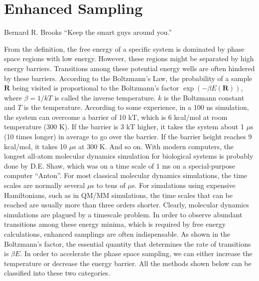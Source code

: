 \chapter{Enhanced Sampling\label{chapter:ES}}
\begin{chapquote}{Bernard R. Brooks%
	}
	``Keep the smart guys around you.''
\end{chapquote}
From the definition, the free energy of a specific system is dominated by phase space regions with low energy. However, these regions might be separated by high energy barriers. Transitions among these potential energy wells are often hindered by these barriers. According to the Boltzmann's Law, the probability of a sample $\mathbf{R}$ being visited is proportional to the Boltzmann's factor $\exp{(-\beta E(\mathbf{R}))}$, where $\beta=1/kT$ is called the inverse temperature. $k$ is the Boltzmann constant and $T$ is the temperature. According to some experience, in a 100 ns simulation, the system can overcome a barrier of 10 kT, which is 6 kcal/mol at room temperature (300 K). If the barrier is 3 kT higher, it takes the system about 1 $\mu$s (10 times longer) in average to go over the barrier. If the barrier height reaches 9 kcal/mol, it takes 10 $\mu$s at 300 K. And so on. With modern computers, the longest all-atom molecular dynamics simulation for biological systems is probably done by D.E. Shaw, which was on a time scale of 1 ms on a special-purpose computer ``Anton''. For most classical molecular dynamics simulations, the time scales are normally several $\mu$s to tens of $\mu$s. For simulations using expensive Hamiltonians, such as in QM/MM simulations, the time scales that can be reached are usually more than three orders shorter. Clearly, molecular dynamics simulations are plagued by a timescale problem. In order to observe abundant transitions among these energy minima, which is required by free energy calculations, enhanced samplings are often indispensable. As shown in the Boltzmann's factor, the essential quantity that determines the rate of transitions is $\beta E$. In order to accelerate the phase space sampling, we can either increase the temperature or decrease the energy barrier. All the methods shown below can be classified into these two categories. 
\clearpage 

\clearpage 

\clearpage 

\clearpage 

\clearpage 

\clearpage
